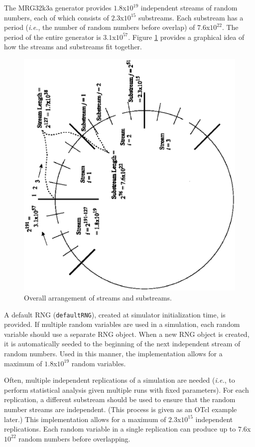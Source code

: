 The MRG32k3a generator provides $1.8$x$10^{19}$ independent
streams of random numbers, each of which consists of
$2.3$x$10^{15}$ substreams. Each substream has a period
(\emph{i.e.}, the number of random numbers before overlap) of
$7.6$x$10^{22}$. The period of the entire generator is
$3.1$x$10^{57}$. Figure \ref{streams} provides a graphical idea of
how the streams and substreams fit together.
\begin{figure}[h]
\centering
\includegraphics[angle=270,width=6 in]{figures/rng-streams.eps}
\caption{Overall arrangement of streams and substreams.
\cite{lecuyer01}} \label{streams}
\end{figure}

A default RNG ({\tt defaultRNG}), created at simulator initialization
time, is provided. If multiple random variables are used in a
simulation, each random variable should use a separate RNG object.
When a new RNG object is created, it is automatically seeded to
the beginning of the next independent stream of random numbers.
Used in this manner, the implementation allows for a maximum of
$1.8$x$10^{19}$ random variables.

Often, multiple independent replications of a simulation are
needed (\emph{i.e.}, to perform statistical analysis given
multiple runs with fixed parameters).  For each replication, a
different substream should be used to ensure that the random
number streams are independent. (This process is given as an OTcl
example later.) This implementation allows for a maximum of
$2.3$x$10^{15}$ independent replications. Each random variable in
a single replication can produce up to $7.6$x$10^{22}$ random
numbers before overlapping.

